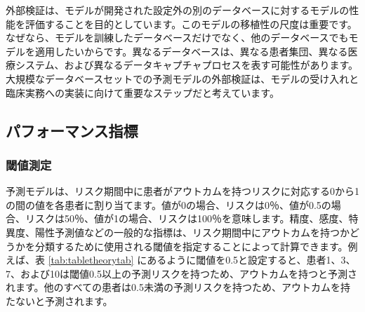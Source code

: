 \documentclass[
  11pt]{book}
\theoremstyle{definition}
\theoremstyle{definition}
\theoremstyle{definition}
\theoremstyle{definition}
\theoremstyle{remark}
\begin{document}
外部検証は、モデルが開発された設定外の別のデータベースに対するモデルの性能を評価することを目的としています。このモデルの移植性の尺度は重要です。なぜなら、モデルを訓練したデータベースだけでなく、他のデータベースでもモデルを適用したいからです。異なるデータベースは、異なる患者集団、異なる医療システム、および異なるデータキャプチャプロセスを表す可能性があります。大規模なデータベースセットでの予測モデルの外部検証は、モデルの受け入れと臨床実務への実装に向けて重要なステップだと考えています。

\subsection{パフォーマンス指標}\label{performance}

\subsubsection*{閾値測定}\label{ux95beux5024ux6e2cux5b9a}

予測モデルは、リスク期間中に患者がアウトカムを持つリスクに対応する0から1の間の値を各患者に割り当てます。値が0の場合、リスクは0％、値が0.5の場合、リスクは50％、値が1の場合、リスクは100％を意味します。精度、感度、特異度、陽性予測値などの一般的な指標は、リスク期間中にアウトカムを持つかどうかを分類するために使用される閾値を指定することによって計算できます。例えば、表 \ref{tab:tabletheorytab} にあるように閾値を0.5と設定すると、患者1、3、7、および10は閾値0.5以上の予測リスクを持つため、アウトカムを持つと予測されます。他のすべての患者は0.5未満の予測リスクを持つため、アウトカムを持たないと予測されます。     
\end{document}
